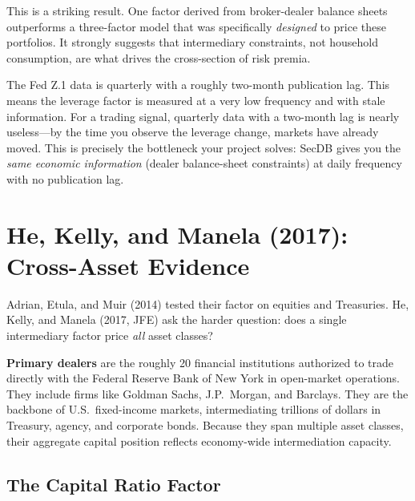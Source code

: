 This is a striking result. One factor derived from broker-dealer balance sheets outperforms a three-factor model that was specifically \emph{designed} to price these portfolios. It strongly suggests that intermediary constraints, not household consumption, are what drives the cross-section of risk premia.

\begin{warning}
The Fed Z.1 data is quarterly with a roughly two-month publication lag. This means the leverage factor is measured at a very low frequency and with stale information. For a trading signal, quarterly data with a two-month lag is nearly useless---by the time you observe the leverage change, markets have already moved. This is precisely the bottleneck your project solves: SecDB gives you the \emph{same economic information} (dealer balance-sheet constraints) at daily frequency with no publication lag.
\end{warning}

\section{He, Kelly, and Manela (2017): Cross-Asset Evidence}
\label{sec:he-kelly-manela}

Adrian, Etula, and Muir (2014) tested their factor on equities and Treasuries. He, Kelly, and Manela (2017, JFE) ask the harder question: does a single intermediary factor price \emph{all} asset classes?

\begin{prereq}
\textbf{Primary dealers} are the roughly 20 financial institutions authorized to trade directly with the Federal Reserve Bank of New York in open-market operations. They include firms like Goldman Sachs, J.P.~Morgan, and Barclays. They are the backbone of U.S.\ fixed-income markets, intermediating trillions of dollars in Treasury, agency, and corporate bonds. Because they span multiple asset classes, their aggregate capital position reflects economy-wide intermediation capacity.
\end{prereq}

\subsection{The Capital Ratio Factor}

